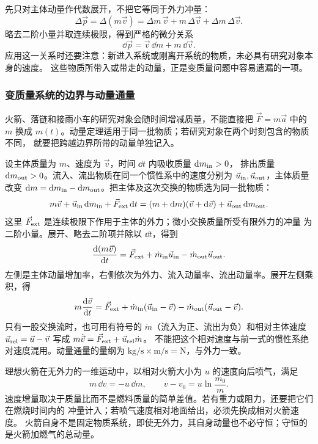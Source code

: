 {先只对主体动量作代数展开，不把它等同于外力冲量：
\begin{equation}
 \Delta\vec p=\Delta(m\vec v)
 =\Delta m\,\vec v+m\,\Delta\vec v+\Delta m\,\Delta\vec v.
\end{equation}
略去二阶小量并取连续极限，得到严格的微分关系
\[
 \dd\vec p=\vec v\,\dd m+m\,\dd\vec v.
\]
应用这一关系时还要注意：新进入系统或刚离开系统的物质，未必具有研究对象本身的速度。
这些物质所带入或带走的动量，正是变质量问题中容易遗漏的一项。

\subsubsection*{变质量系统的边界与动量通量}

火箭、落链和接雨小车的研究对象会随时间增减质量，不能直接把 $\vec F=m\vec a$ 中的
$m$ 换成 $m(t)$。动量定理适用于同一批物质；若研究对象在两个时刻包含的物质不同，
就要把跨越边界所带的动量单独记入。

设主体质量为 $m$、速度为 $\vec v$，时间 $\dd t$ 内吸收质量 $\dd m_{\rm in}>0$，
排出质量 $\dd m_{\rm out}>0$。流入、流出物质在同一个惯性系中的速度分别为
$\vec u_{\rm in},\vec u_{\rm out}$，主体质量改变
$\dd m=\dd m_{\rm in}-\dd m_{\rm out}$。把主体及这次交换的物质选为同一批物质：
\[
 m\vec v+\vec u_{\rm in}\dd m_{\rm in}+\vec F_{\rm ext}\dd t
 =(m+\dd m)(\vec v+\dd\vec v)+\vec u_{\rm out}\dd m_{\rm out}.
\]
这里 $\vec F_{\rm ext}$ 是连续极限下作用于主体的外力；微小交换质量所受有限外力的冲量
为二阶小量。展开、略去二阶项并除以 $\dd t$，得到
\begin{equation}\label{ch07:eq:mass-flux-balance}
 \frac{\dd(m\vec v)}{\dd t}
 =\vec F_{\rm ext}+\dot m_{\rm in}\vec u_{\rm in}
 -\dot m_{\rm out}\vec u_{\rm out}.
\end{equation}
左侧是主体动量增加率，右侧依次为外力、流入动量率、流出动量率。展开左侧乘积，得
\begin{equation}\label{ch07:eq:mass-acceleration}
 m\frac{\dd\vec v}{\dd t}
 =\vec F_{\rm ext}+\dot m_{\rm in}(\vec u_{\rm in}-\vec v)
 -\dot m_{\rm out}(\vec u_{\rm out}-\vec v).
\end{equation}
只有一股交换流时，也可用有符号的 $\dot m$（流入为正、流出为负）和相对主体速度
$\vec u_{\rm rel}=\vec u-\vec v$ 写成 $m\dot{\vec v}=\vec F_{\rm ext}+\vec u_{\rm rel}\dot m$。
不能把这个相对速度与前一式的惯性系绝对速度混用。动量通量的量纲为
$\mathrm{kg/s}\times\mathrm{m/s}=\mathrm N$，与外力一致。

理想火箭在无外力的一维运动中，以相对火箭大小为 $u$ 的速度向后喷气，满足
\begin{equation}
 m\,\dd v=-u\,\dd m,
 \qquad
 v-v_0=u\ln\frac{m_0}{m}.
\end{equation}
速度增量取决于质量比而不是燃料质量的简单差值。若有重力或阻力，还要把它们在燃烧时间内的
冲量计入；若喷气速度相对地面给出，必须先换成相对火箭速度。
火箭自身不是固定物质系统，即使无外力，其自身动量也不必守恒；守恒的是火箭加燃气的总动量。

}
